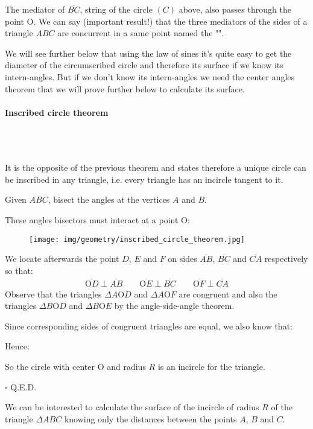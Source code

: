 	\begin{tcolorbox}[title=Remark,colframe=black,arc=10pt]
	The mediator of $\overline{BC}$, string of the circle $(C)$ above, also passes through the point O. We can say (important result!) that the three mediators of the sides of a triangle $ABC$ are concurrent in a same point named the "".
	\end{tcolorbox}
	We will see further below that using the law of sines it's quite easy to get the diameter of the circumscribed circle and therefore its surface if we know its intern-angles. But if we don't know its intern-angles we need the center angles theorem that we will prove further below to calculate its surface.

	\paragraph{Inscribed circle theorem}\mbox{}\\\\
	\begin{theorem}
	It is the opposite of the previous theorem and states therefore a unique circle can be inscribed in any triangle, i.e. every triangle has an incircle tangent to it.
	\end{theorem}
	\begin{dem}
	Given $ABC$, bisect the angles at the vertices $A$ and $B$.

	These angles bisectors must interact at a point O:
	\begin{figure}[H]
		\centering
		\texttt{[image: img/geometry/inscribed\_circle\_theorem.jpg]}
	\end{figure}

	We locate afterwards the point $D$, $E$ and $F$ on sides $\overline{AB}$, $\overline{BC}$ and $\overline{CA}$ respectively so that:
	\begin{gather*}
		\overline{\text{O}D}\perp \overline{AB} \qquad \overline{\text{O}E}\perp \overline{BC}  \qquad \overline{\text{O}F}\perp \overline{CA} 
	\end{gather*}
	Observe that the triangles $\Delta A\text{O}D$ and $\Delta A\text{O}F$ are congruent and also the triangles $\Delta B\text{O}D$ and $\Delta B\text{O}E$ by the angle-side-angle theorem.
	
	Since corresponding sides of congruent triangles are equal, we also know that:
	
	Hence:
	
	So the circle with center O and radius $R$ is an incircle for the triangle.
	\begin{flushright}
		$\square$  Q.E.D.
	\end{flushright}
	\end{dem}
	We can be interested to calculate the surface of the incircle of radius $R$ of the triangle $\Delta ABC$ knowing only the distances between the points $A$, $B$ and $C$.
	
